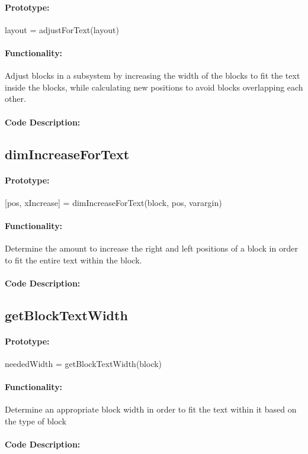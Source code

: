 \documentclass[12pt,letterpaper]{report}
\begin{document}
\paragraph{Prototype:} layout = adjustForText(layout)
\paragraph{Functionality:} Adjust blocks in a subsystem by increasing the width of the blocks to fit the text inside the blocks, while calculating new positions to avoid blocks overlapping each other.
\paragraph{Code Description:}

\subsection{dimIncreaseForText}
\paragraph{Prototype:} [pos, xIncrease] = dimIncreaseForText(block, pos, varargin)
\paragraph{Functionality:} Determine the amount to increase the right and left positions of a block in order to fit the entire text within the block.
\paragraph{Code Description:}

\subsection{getBlockTextWidth}
\paragraph{Prototype:} neededWidth = getBlockTextWidth(block)
\paragraph{Functionality:} Determine an appropriate block width in order to fit the text within it based on the type of block
\paragraph{Code Description:}
\end{document}

